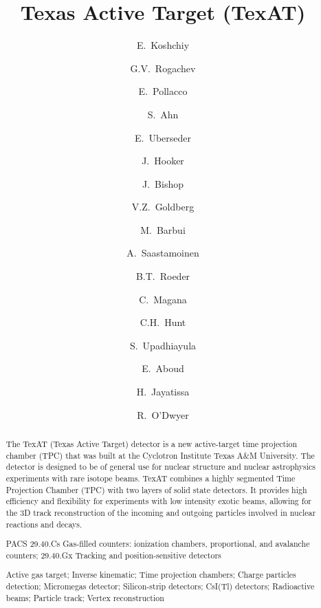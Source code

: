 \documentclass[final,number,sort&compress,5p,times,twocolumn]{elsarticle}
\begin{document}
\begin{frontmatter}


\title{Texas Active Target (TexAT)}
    
 \author[Cyclotron]{E.~Koshchiy}
  
 \author[Cyclotron,TAMU] {G.V.~Rogachev}
 
 \author[IRFU]{E.~Pollacco}

 \author[Cyclotron]{S.~Ahn}
 
 \author[Cyclotron]{E.~Uberseder}
 
 \author[Cyclotron]{ J.~Hooker} 
 
 \author[Cyclotron,TAMU]{J.~Bishop}
 
 \author[Cyclotron]{V.Z.~Goldberg}
 
 \author[Cyclotron]{M.~Barbui}
 
 \author[Cyclotron]{A.~Saastamoinen}
 
 \author[Cyclotron]{B.T.~Roeder}
 
 \author[Cyclotron]{C.~Magana}
 
 \author[Cyclotron]{C.H.~Hunt}
  
 \author[Cyclotron]{S.~Upadhiayula}

 \author[Cyclotron]{E.~Aboud}
 
 \author[Cyclotron]{H.~Jayatissa}
 
 \author[Cyclotron,TAMU]{R.~O'Dwyer}

  \address[Cyclotron]{Cyclotron Institute, Texas A\&M University, College Station, TX 77843, USA}
  
  \address[TAMU]{Department of Physics \& Astronomy, Texas A\&M University, College Station, TX 77843, USA}
  
  \address[IRFU]{IRFU, CEA, Saclay, Gif-Sur-Ivette, France}

 
  \begin{abstract}
  
The TexAT (Texas Active Target) detector is a new active-target time projection chamber (TPC) that was built at the Cyclotron Institute Texas A$\&$M University. The detector is designed to be of  general use for nuclear structure and nuclear astrophysics experiments with rare isotope beams. TexAT combines a highly segmented Time Projection  Chamber (TPC) with two layers of solid state detectors. It provides high efficiency and flexibility for experiments with low intensity exotic beams, allowing for the 3D track reconstruction of the incoming and outgoing particles involved in nuclear reactions and decays.

PACS 29.40.Cs Gas-filled counters: ionization chambers, proportional, and avalanche counters; 29.40.Gx Tracking and position-sensitive detectors

\begin{keyword}
    Active gas target;  Inverse kinematic; Time projection chambers;  Charge particles detection; Micromegas detector;
    Silicon-strip detectors; CsI(Tl)  detectors; Radioactive beams; Particle track; Vertex reconstruction
\end{keyword}


\end{abstract}
\end{frontmatter}
\end{document}
